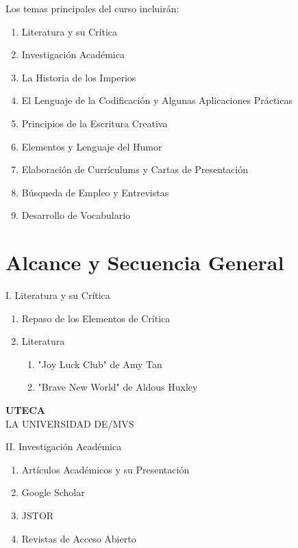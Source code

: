 \documentclass[12pt]{article}
\begin{document}
Los temas principales del curso incluirán:
\begin{enumerate}
    \item Literatura y su Crítica
    \item Investigación Académica
    \item La Historia de los Imperios
    \item El Lenguaje de la Codificación y Algunas Aplicaciones Prácticas
    \item Principios de la Escritura Creativa
    \item Elementos y Lenguaje del Humor
    \item Elaboración de Currículums y Cartas de Presentación
    \item Búsqueda de Empleo y Entrevistas
    \item Desarrollo de Vocabulario
\end{enumerate}

\section*{Alcance y Secuencia General}
\noindent I. Literatura y su Crítica
\begin{enumerate}
    \item Repaso de los Elementos de Crítica
    \item Literatura
    \begin{enumerate}
        \item "Joy Luck Club" de Amy Tan
        \item "Brave New World" de Aldous Huxley
    \end{enumerate}
\end{enumerate}

\clearpage %

\noindent\textbf{UTECA} \\
\noindent LA UNIVERSIDAD DE/MVS

\vspace{1cm}

\noindent II. Investigación Académica
\begin{enumerate}
    \item Artículos Académicos y su Presentación
    \item Google Scholar
    \item JSTOR
    \item Revistas de Acceso Abierto
\end{enumerate}
\end{document}
